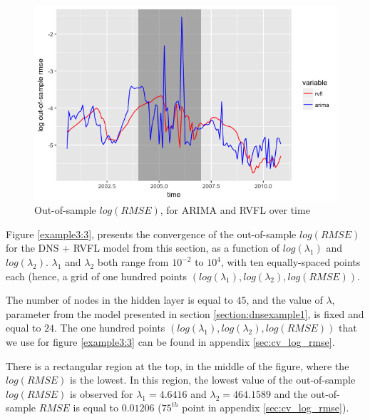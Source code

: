 \begin{figure}[!htb]
\centering
  \includegraphics[width=14cm]{gfx/chapter-rvfl-mts/log_oos_rmse_rvfl_arima}
\caption{Out-of-sample $log(RMSE)$, for ARIMA and RVFL over time}
\label{example3:2}       %
\end{figure}

\medskip

Figure \ref{example3:3}, presents the convergence of the out-of-sample $log(RMSE)$ for the DNS + RVFL model from this section, as a function of $log(\lambda_1)$ and $log(\lambda_2)$. $\lambda_1$ and $\lambda_2$ both range from $10^{-2}$ to $10^{4}$, with ten equally-spaced points each (hence, a grid of one hundred points $\left( log(\lambda_1), log(\lambda_2), log(RMSE)\right)$.

\medskip

The number of nodes in the hidden layer is equal to $45$, and the value of $\lambda$, parameter from the \cite{nelson1987parsimonious} model presented in section \ref{section:dnsexample1}, is fixed and equal to $24$. The one hundred points $\left( log(\lambda_1), log(\lambda_2), log(RMSE)\right)$ that we use for figure \ref{example3:3} can be found in appendix \ref{sec:cv_log_rmse}.

\medskip

There is a rectangular region at the top, in the middle of the figure, where the $log(RMSE)$ is the lowest. In this region, the lowest value of the out-of-sample $log(RMSE)$ is observed for $\lambda_1 = 4.6416$ and $\lambda_2 = 464.1589$ and the out-of-sample $RMSE$ is equal to $0.01206$ ($75^{th}$ point in appendix \ref{sec:cv_log_rmse}).

